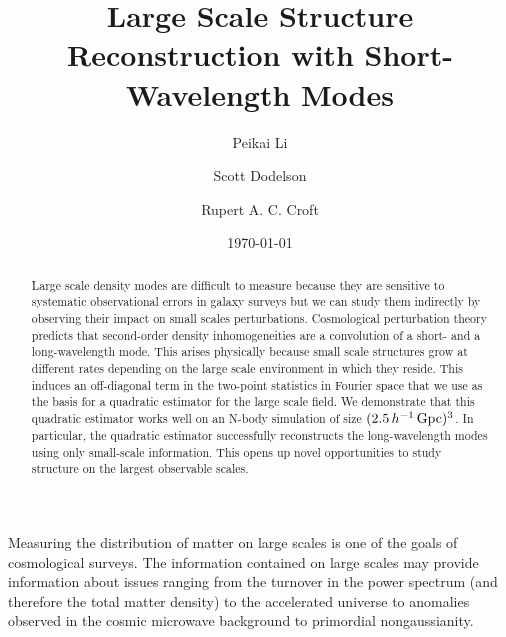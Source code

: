 \documentclass[prd,amsmath,amssymb,floatfix,superscriptaddress,nofootinbib,twocolumn]{revtex4-1}
\newcommand{\peikai}[1]{{\color{blue} #1}}
\newcommand{\RC}[1]{{\color{darkorange} #1}}
\begin{document}
\title{Large Scale Structure Reconstruction with Short-Wavelength Modes}
\author{\large Peikai Li}
\author{\large Scott Dodelson}
\author{\large Rupert A. C. Croft}

\date{\today}
\begin{abstract}
\noindent Large scale density modes are difficult to measure because they are sensitive to systematic observational errors in galaxy surveys but we can study them indirectly by observing their impact on small scales perturbations. Cosmological perturbation theory predicts that second-order density inhomogeneities are a convolution of a short- and a long-wavelength mode. This arises physically because small scale structures grow at different rates depending on the large scale environment in which they reside. This induces an off-diagonal term in the two-point statistics in Fourier space that we use as the basis for a quadratic estimator for the large scale field. We demonstrate that this quadratic estimator works well on an N-body simulation of size  $(2.5\,h^{-1}\,\rm Gpc)^3$. In particular, the quadratic estimator successfully reconstructs the long-wavelength modes using only small-scale information. This opens up novel opportunities to study structure on the largest observable scales. 

\end{abstract}
\maketitle
{}
Measuring the distribution of matter on large scales is one of the goals of cosmological surveys. The information contained on large scales may provide information about issues ranging from the turnover in the power spectrum (and therefore the total matter density) to the accelerated universe to anomalies observed in the cosmic microwave background to primordial nongaussianity. %
\end{document}
